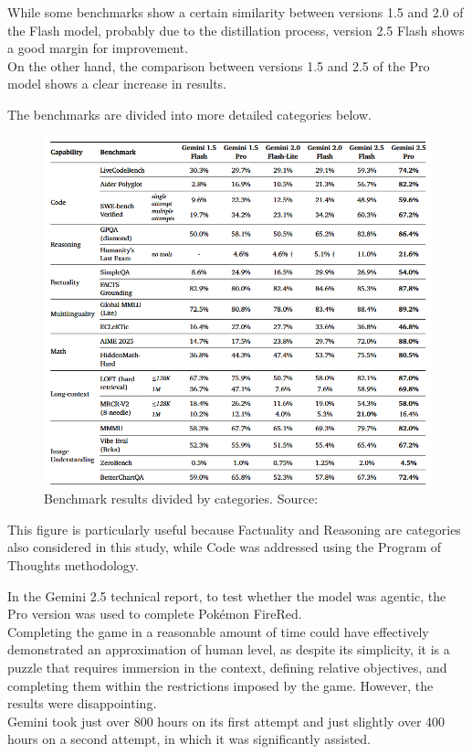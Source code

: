 \documentclass[12pt]{article}
\begin{document}
While some benchmarks show a certain similarity between versions 1.5 and 2.0 of the Flash model, probably due to the distillation process, version 2.5 Flash shows a good margin for improvement.\\
On the other hand, the comparison between versions 1.5 and 2.5 of the Pro model shows a clear increase in results.

The benchmarks are divided into more detailed categories below. 
    
    \begin{figure}[H]
    \centering
            \includegraphics[width=1\textwidth]{TableGeminiBenchmarks.png}
    \caption[Detailed table of Gemini benchmarks]{Benchmark results divided by categories. Source: \cite{comanici2025gemini25pushingfrontier}}
    \label{fig:15}
    \end{figure}    
    
This figure is particularly useful because Factuality and Reasoning are categories also considered in this study, while Code was addressed using the Program of Thoughts methodology.    

In the Gemini 2.5 technical report, to test whether the model was agentic, the Pro version was used to complete Pokémon FireRed.\\
Completing the game in a reasonable amount of time could have effectively demonstrated an approximation of human level, as despite its simplicity, it is a puzzle that requires immersion in the context, defining relative objectives, and completing them within the restrictions imposed by the game. However, the results were disappointing.\\
Gemini took just over 800 hours on its first attempt and just slightly over 400 hours on a second attempt, in which it was significantly assisted.\cite{comanici2025gemini25pushingfrontier}
\end{document}
